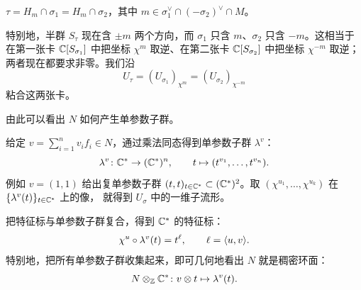 \begin{claim}\label{claim:tau-hyperplane}
$\tau = H_m\cap\sigma_1 = H_m\cap\sigma_2$，其中
$m\in\sigma_1^\vee\cap(-\sigma_2)^\vee\cap M$。
\end{claim}

特别地，半群 $S_\tau$ 现在含 $\pm m$ 两个方向，而 $\sigma_1$ 只含 $m$、$\sigma_2$
只含 $-m$。这相当于在第一张卡 $\mathbb{C}[S_{\sigma_1}]$ 中把坐标 $\chi^m$ 取逆、在第二张卡
$\mathbb{C}[S_{\sigma_2}]$ 中把坐标 $\chi^{-m}$ 取逆；两者现在都要求非零。我们沿
\[
U_\tau = (U_{\sigma_1})_{\chi^m} = (U_{\sigma_2})_{\chi^{-m}}
\]
粘合这两张卡。


由此可以看出 $N$ 如何产生单参数子群。

\begin{definition}[单参数子群（1-PS）]\label{def:one-parameter}
给定 $v = \sum_{i=1}^n v_i f_i\in N$，通过乘法同态得到单参数子群 $\lambda^v$：
\[
\lambda^v\colon \mathbb{C}^*\to(\mathbb{C}^*)^n,\qquad t\mapsto(t^{v_1},\dots,t^{v_n}).
\]
例如 $v=(1,1)$ 给出复单参数子群 $(t,t)_{t\in\mathbb{C}^*}\subset(\mathbb{C}^*)^2$。取
$(\chi^{u_1},\dots,\chi^{u_k})$ 在 $\{\lambda^v(t)\}_{t\in\mathbb{C}^*}$ 上的像，
就得到 $U_\sigma$ 中的一维子流形。
\end{definition}

\begin{remark}
把特征标与单参数子群复合，得到 $\mathbb{C}^*$ 的特征标：
\[
\chi^u\circ\lambda^v(t) = t^\ell,\qquad \ell = \langle u,v\rangle.
\]
特别地，把所有单参数子群收集起来，即可几何地看出 $N$ 就是稠密环面：
\[
N\otimes_{\mathbb{Z}}\mathbb{C}^*\colon v\otimes t\mapsto\lambda^v(t).
\]
\end{remark}

